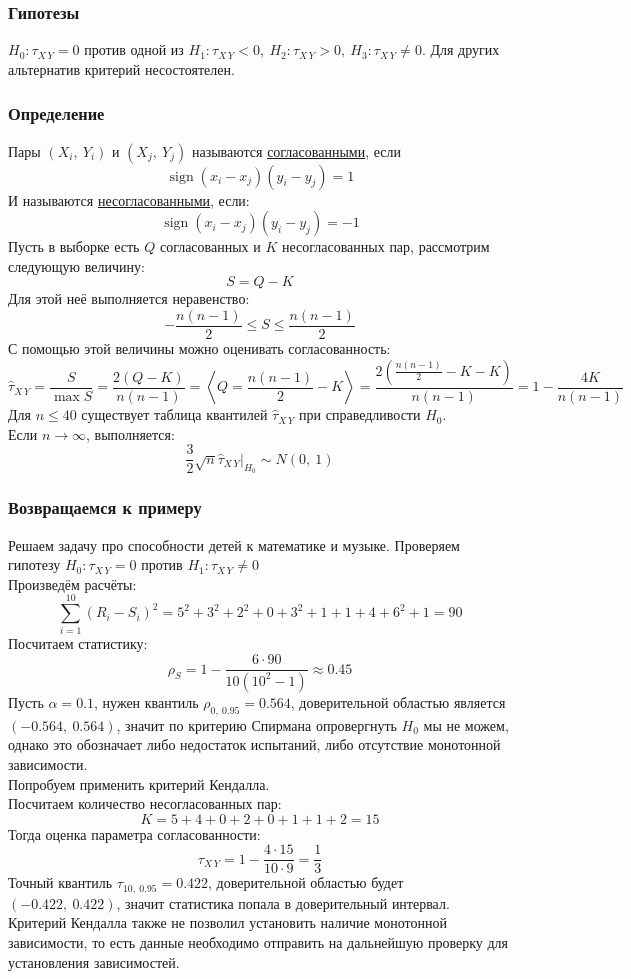 \documentclass[12pt, a4paper]{article}
\DeclareMathOperator{\sign}{sign}
\begin{document}
\subsubsection*{Гипотезы}
$H_0: \tau_{X\, Y} = 0$ против одной из $H_1: \tau_{X\, Y} < 0,\ H_2: \tau_{X\, Y} > 0,\ H_3: \tau_{X\, Y} \neq 0$. Для других альтернатив критерий несостоятелен.
\subsubsection*{Определение}
Пары $(X_i,\ Y_i)$ и $(X_j,\ Y_j)$ называются \underline{согласованными}, если
\[\sign (x_i - x_j)(y_i - y_j) = 1\]
И называются \underline{несогласованными}, если:
\[\sign (x_i - x_j)(y_i - y_j) = -1\]
Пусть в выборке есть $Q$ согласованных и $K$ несогласованных пар, рассмотрим следующую величину:
\[
S = Q - K
\]
Для этой неё выполняется неравенство:
\[
-\frac{n(n - 1)}{2} \leq S \leq \frac{n(n - 1)}{2}
\]
С помощью этой величины можно оценивать согласованность:
\[\hat \tau_{X\, Y} = \frac{S}{\max S} = \frac{2 (Q - K)}{n(n - 1)} = \left<Q = \frac{n(n - 1)}{2} - K \right> = \frac{2\left( \frac{n(n - 1)}{2} - K - K \right)}{n(n - 1)} = 1 - \frac{4K}{n(n - 1)}\]
Для $n \leq 40$ существует таблица квантилей $\hat \tau_{X\, Y}$ при справедливости $H_0$.\\
Если $n \to \infty$, выполняется:
\[\frac{3}{2}\sqrt{n} \hat \tau_{X\, Y}\Big|_{H_0} \sim N(0,\ 1)\]
\subsubsection*{Возвращаемся к примеру}
Решаем задачу про способности детей к математике и музыке. Проверяем гипотезу $H_0: \tau_{X\, Y} = 0$ против $H_1: \tau_{X\, Y} \neq 0$\\
Произведём расчёты:
\[ \sum_{i = 1}^{10} {\left( R_i - S_i \right)}^2 = 5^2 + 3^2 + 2^2 + 0 + 3^2 + 1 + 1 + 4 + 6^2 + 1 = 90 \]
Посчитаем статистику:
\[\rho_S = 1 - \frac{6\cdot 90}{10 (10^2 - 1)} \approx 0.45\]
Пусть $\alpha = 0.1$, нужен квантиль $\rho_{0,\ 0.95} = 0.564$, доверительной областью является $(-0.564,\ 0.564)$, значит по критерию Спирмана опровергнуть $H_0$ мы не можем, однако это обозначает либо недостаток испытаний, либо отсутствие монотонной зависимости.\\
Попробуем применить критерий Кендалла.\\
Посчитаем количество несогласованных пар:
\[K = 5 + 4 + 0 + 2 + 0 + 1 + 1 + 2 = 15\]
Тогда оценка параметра согласованности:
\[\tau_{X\, Y} = 1 - \frac{4\cdot 15}{10 \cdot 9} = \frac{1}{3}\]
Точный квантиль $\tau_{10,\ 0.95} = 0.422$, доверительной областью будет $(-0.422,\ 0.422)$, значит статистика попала в доверительный интервал. Критерий Кендалла также не позволил установить наличие монотонной зависимости, то есть данные необходимо отправить на дальнейшую проверку для установления зависимостей. 
\end{document}
